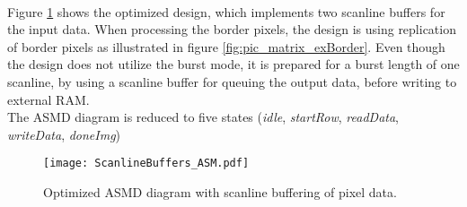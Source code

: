 \paragraph*{}
Figure \ref{fig:ASMD_ScanlineBuffers} shows the optimized design, which implements two scanline buffers for the input data. When processing the border pixels, the design is using replication of border pixels as illustrated in figure \ref{fig:pic_matrix_exBorder}. 
Even though the design does not utilize the burst mode, it is prepared for a burst length of one scanline, by using a scanline buffer for queuing the output data, before writing to external RAM.\\
The ASMD diagram is reduced to five states (\emph{idle}, \emph{startRow}, \emph{readData}, \emph{writeData}, \emph{doneImg})

\begin{figure}[H]
	\centering
	\texttt{[image: ScanlineBuffers\_ASM.pdf]}
	\caption{Optimized ASMD diagram with scanline buffering of pixel data.}
	\label{fig:ASMD_ScanlineBuffers}
\end{figure}
